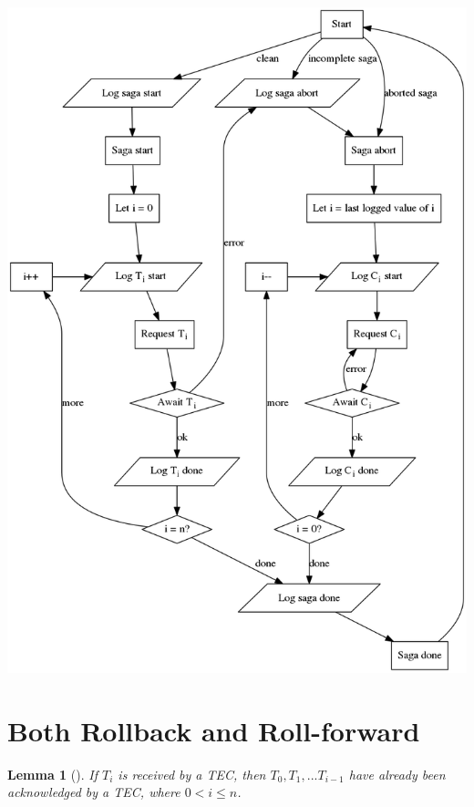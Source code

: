 \documentclass{article}
\newtheorem{lemma}{Lemma}[section]
\begin{document}
\includegraphics[width=\linewidth]{flow}

\section{Both Rollback and Roll-forward}

\begin{lemma}[]
\label{t_contiguous}
If $T_i$ is received by a TEC, then $T_0, T_1, ... T_{i-1}$ have already been
acknowledged by a TEC, where $0 < i \le n$.
\end{lemma}
\end{document}
